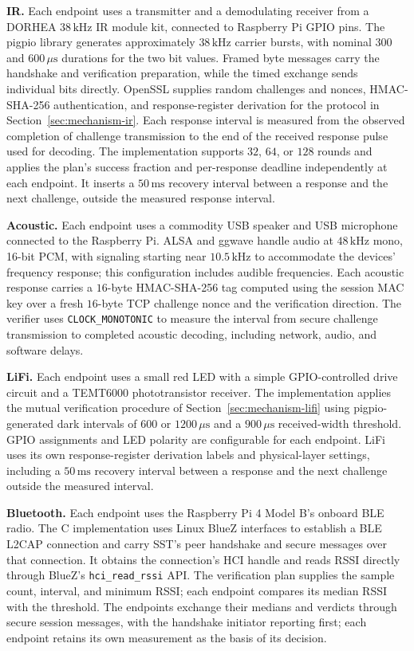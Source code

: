 \documentclass[sigconf,authordraft]{acmart}
\begin{document}
\noindent
\textbf{IR.}
Each endpoint uses a transmitter and a demodulating receiver from a DORHEA $38\,\mathrm{kHz}$ IR module kit, connected to Raspberry Pi GPIO pins.
The pigpio library generates approximately $38\,\mathrm{kHz}$ carrier bursts, with nominal $300$ and $600\,\mu\mathrm{s}$ durations for the two bit values.
Framed byte messages carry the handshake and verification preparation, while the timed exchange sends individual bits directly.
OpenSSL supplies random challenges and nonces, HMAC-SHA-256 authentication, and response-register derivation for the protocol in Section~\ref{sec:mechanism-ir}.
Each response interval is measured from the observed completion of challenge transmission to the end of the received response pulse used for decoding.
The implementation supports $32$, $64$, or $128$ rounds and applies the plan's success fraction and per-response deadline independently at each endpoint.
It inserts a $50\,\mathrm{ms}$ recovery interval between a response and the next challenge, outside the measured response interval.

\noindent
\textbf{Acoustic.}
Each endpoint uses a commodity USB speaker and USB microphone connected to the Raspberry Pi.
ALSA and ggwave handle audio at $48\,\mathrm{kHz}$ mono, 16-bit PCM, with signaling starting near $10.5\,\mathrm{kHz}$ to accommodate the devices' frequency response; this configuration includes audible frequencies.
Each acoustic response carries a $16$-byte HMAC-SHA-256 tag computed using the session MAC key over a fresh $16$-byte TCP challenge nonce and the verification direction.
The verifier uses \texttt{CLOCK\_MONOTONIC} to measure the interval from secure challenge transmission to completed acoustic decoding, including network, audio, and software delays.

\noindent
\textbf{LiFi.}
Each endpoint uses a small red LED with a simple GPIO-controlled drive circuit and a TEMT6000 phototransistor receiver.
The implementation applies the mutual verification procedure of Section~\ref{sec:mechanism-lifi} using pigpio-generated dark intervals of $600$ or $1200\,\mu\mathrm{s}$ and a $900\,\mu\mathrm{s}$ received-width threshold.
GPIO assignments and LED polarity are configurable for each endpoint.
LiFi uses its own response-register derivation labels and physical-layer settings, including a $50\,\mathrm{ms}$ recovery interval between a response and the next challenge outside the measured interval.

\noindent
\textbf{Bluetooth.}
Each endpoint uses the Raspberry Pi 4 Model B's onboard BLE radio.
The C implementation uses Linux BlueZ interfaces to establish a BLE L2CAP connection and carry SST's peer handshake and secure messages over that connection.
It obtains the connection's HCI handle and reads RSSI directly through BlueZ's \texttt{hci\_read\_rssi} API.
The verification plan supplies the sample count, interval, and minimum RSSI; each endpoint compares its median RSSI with the threshold.
The endpoints exchange their medians and verdicts through secure session messages, with the handshake initiator reporting first; each endpoint retains its own measurement as the basis of its decision.
\end{document}
